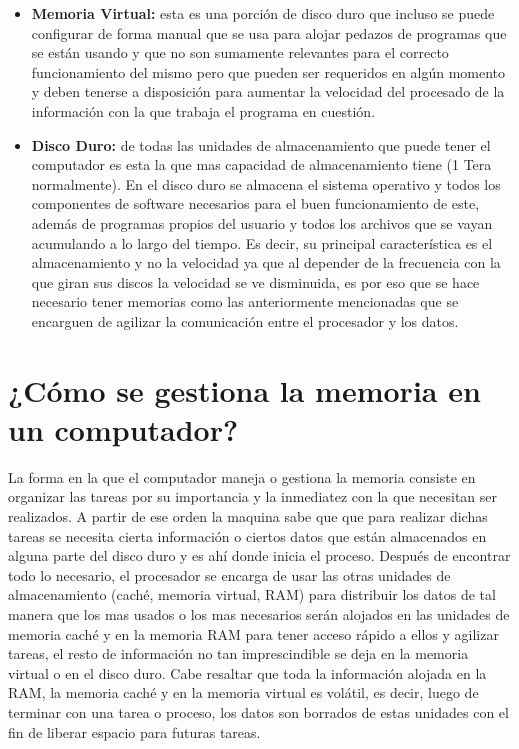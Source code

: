 \documentclass{article}
\begin{document}
\begin{itemize}
    \item \textbf{Memoria Virtual: } esta es una porción de disco duro que incluso se puede configurar de forma manual que se usa para alojar pedazos de programas que se están usando y que no son sumamente relevantes para el correcto funcionamiento del mismo pero que pueden ser requeridos en algún momento y deben tenerse a disposición para aumentar la velocidad del procesado de la información con la que trabaja el programa en cuestión.
    
    \item \textbf{Disco Duro: } de todas las unidades de almacenamiento que puede tener el computador es esta la que mas capacidad de almacenamiento tiene (1 Tera normalmente). En el disco duro se almacena el sistema operativo y todos los componentes de software necesarios para el buen funcionamiento de este, además de programas propios del usuario y todos los archivos que se vayan acumulando a lo largo del tiempo. Es decir, su principal característica es el almacenamiento y no la velocidad ya que al depender de la frecuencia con la que giran sus discos la velocidad se ve disminuida, es por eso que se hace necesario tener memorias como las anteriormente mencionadas que se encarguen de agilizar la comunicación entre el procesador y los datos.
\end{itemize}


\section{¿Cómo se gestiona la memoria en un computador?} 
La forma en la que el computador maneja o gestiona la memoria consiste en organizar las tareas por su importancia y la inmediatez con la que necesitan ser realizados. A partir de ese orden la maquina sabe que que para realizar dichas tareas se necesita cierta información o ciertos datos que están almacenados en alguna parte del disco duro y es ahí donde inicia el proceso. Después de encontrar todo lo necesario, el procesador se encarga de usar las otras unidades de almacenamiento (caché, memoria virtual, RAM) para distribuir los datos de tal manera que los mas usados o los mas necesarios serán alojados en las unidades de memoria caché y en la memoria RAM para tener acceso rápido a ellos y agilizar tareas, el resto de información no tan imprescindible se deja en la memoria virtual o en el disco duro. Cabe resaltar que toda la información alojada en la RAM, la memoria caché y en la memoria virtual es volátil, es decir, luego de terminar con una tarea o proceso, los datos son borrados de estas unidades con el fin de liberar espacio para futuras tareas.
\end{document}
